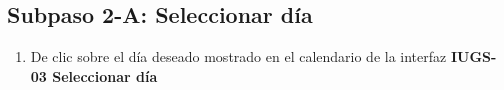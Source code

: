 \subsection{Subpaso 2-A: Seleccionar día}
\begin{enumerate}
	\item De clic sobre el día deseado mostrado en el calendario de la interfaz  \textbf{IUGS-03 Seleccionar día}
\end{enumerate}
